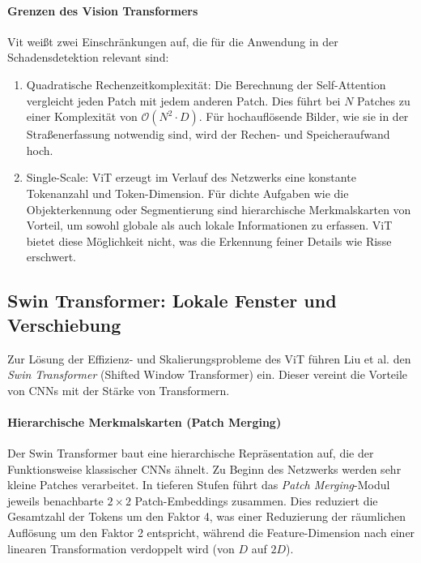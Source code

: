 \paragraph{Grenzen des Vision Transformers}
Vit weißt zwei Einschränkungen auf, die für die Anwendung in der Schadensdetektion relevant sind:
\begin{enumerate}
    \item Quadratische Rechenzeitkomplexität: Die Berechnung der Self-Attention vergleicht jeden Patch mit jedem anderen Patch. Dies führt bei $N$ Patches zu einer Komplexität von $\mathcal{O}(N^2 \cdot D)$. Für hochauflösende Bilder, wie sie in der Straßenerfassung notwendig sind, wird der Rechen- und Speicheraufwand hoch.
    \item Single-Scale: ViT erzeugt im Verlauf des Netzwerks eine konstante Tokenanzahl und Token-Dimension. Für dichte Aufgaben wie die Objekterkennung oder Segmentierung sind hierarchische Merkmalskarten von Vorteil, um sowohl globale als auch lokale Informationen zu erfassen. ViT bietet diese Möglichkeit nicht, was die Erkennung feiner Details wie Risse erschwert.
\end{enumerate}

\subsection{Swin Transformer: Lokale Fenster und Verschiebung}
\label{subsec:swin_transformer}

Zur Lösung der Effizienz- und Skalierungsprobleme des ViT führen Liu et al. \cite{swin2021} den \emph{Swin Transformer} (Shifted Window Transformer) ein. Dieser vereint die Vorteile von CNNs mit der Stärke von Transformern.

\paragraph{Hierarchische Merkmalskarten (Patch Merging)}
Der Swin Transformer baut eine hierarchische Repräsentation auf, die der Funktionsweise klassischer CNNs ähnelt. Zu Beginn des Netzwerks werden sehr kleine Patches verarbeitet. In tieferen Stufen führt das \emph{Patch Merging}-Modul jeweils benachbarte $2 \times 2$ Patch-Embeddings zusammen. Dies reduziert die Gesamtzahl der Tokens um den Faktor 4, was einer Reduzierung der räumlichen Auflösung um den Faktor 2 entspricht, während die Feature-Dimension nach einer linearen Transformation verdoppelt wird (von $D$ auf $2D$).

